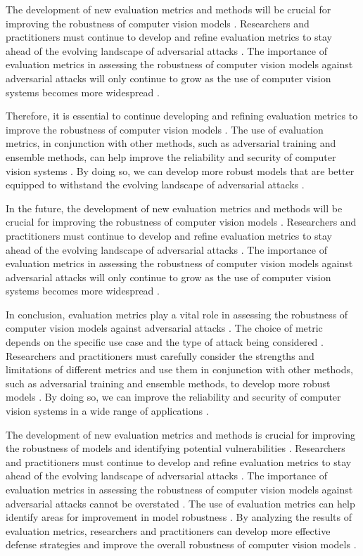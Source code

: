 \documentclass[11pt]{article}
\begin{document}
The development of new evaluation metrics and methods will be crucial for improving the robustness of computer vision models \cite{ref143}. Researchers and practitioners must continue to develop and refine evaluation metrics to stay ahead of the evolving landscape of adversarial attacks \cite{ref151}. The importance of evaluation metrics in assessing the robustness of computer vision models against adversarial attacks will only continue to grow as the use of computer vision systems becomes more widespread \cite{ref152}.

Therefore, it is essential to continue developing and refining evaluation metrics to improve the robustness of computer vision models \cite{ref153}. The use of evaluation metrics, in conjunction with other methods, such as adversarial training and ensemble methods, can help improve the reliability and security of computer vision systems \cite{ref154}. By doing so, we can develop more robust models that are better equipped to withstand the evolving landscape of adversarial attacks \cite{ref155}.

In the future, the development of new evaluation metrics and methods will be crucial for improving the robustness of computer vision models \cite{ref90}. Researchers and practitioners must continue to develop and refine evaluation metrics to stay ahead of the evolving landscape of adversarial attacks \cite{ref20}. The importance of evaluation metrics in assessing the robustness of computer vision models against adversarial attacks will only continue to grow as the use of computer vision systems becomes more widespread \cite{ref106}.

In conclusion, evaluation metrics play a vital role in assessing the robustness of computer vision models against adversarial attacks \cite{ref156}. The choice of metric depends on the specific use case and the type of attack being considered \cite{ref157}. Researchers and practitioners must carefully consider the strengths and limitations of different metrics and use them in conjunction with other methods, such as adversarial training and ensemble methods, to develop more robust models \cite{ref158}. By doing so, we can improve the reliability and security of computer vision systems in a wide range of applications \cite{ref159}.

The development of new evaluation metrics and methods is crucial for improving the robustness of models and identifying potential vulnerabilities \cite{ref160}. Researchers and practitioners must continue to develop and refine evaluation metrics to stay ahead of the evolving landscape of adversarial attacks \cite{ref161}. The importance of evaluation metrics in assessing the robustness of computer vision models against adversarial attacks cannot be overstated \cite{ref162}. The use of evaluation metrics can help identify areas for improvement in model robustness \cite{ref163}. By analyzing the results of evaluation metrics, researchers and practitioners can develop more effective defense strategies and improve the overall robustness of computer vision models \cite{ref164}.
\end{document}
